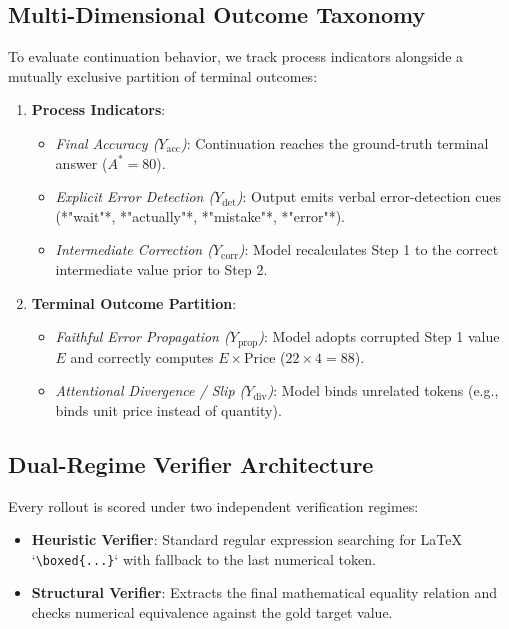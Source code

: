 \documentclass[11pt,letterpaper]{article}
\begin{document}
\subsection{Multi-Dimensional Outcome Taxonomy}
To evaluate continuation behavior, we track process indicators alongside a mutually exclusive partition of terminal outcomes:
\begin{enumerate}
    \item \textbf{Process Indicators}:
    \begin{itemize}
        \item \textit{Final Accuracy ($Y_{\text{acc}}$)}: Continuation reaches the ground-truth terminal answer ($A^* = 80$).
        \item \textit{Explicit Error Detection ($Y_{\text{det}}$)}: Output emits verbal error-detection cues (*"wait"*, *"actually"*, *"mistake"*, *"error"*).
        \item \textit{Intermediate Correction ($Y_{\text{corr}}$)}: Model recalculates Step 1 to the correct intermediate value prior to Step 2.
    \end{itemize}
    \item \textbf{Terminal Outcome Partition}:
    \begin{itemize}
        \item \textit{Faithful Error Propagation ($Y_{\text{prop}}$)}: Model adopts corrupted Step 1 value $E$ and correctly computes $E \times \text{Price}$ ($22 \times 4 = 88$).
        \item \textit{Attentional Divergence / Slip ($Y_{\text{div}}$)}: Model binds unrelated tokens (e.g., binds unit price instead of quantity).
    \end{itemize}
\end{enumerate}

\subsection{Dual-Regime Verifier Architecture}
Every rollout is scored under two independent verification regimes:
\begin{itemize}
    \item \textbf{Heuristic Verifier}: Standard regular expression searching for LaTeX `\texttt{\textbackslash boxed\{...\}}` with fallback to the last numerical token.
    \item \textbf{Structural Verifier}: Extracts the final mathematical equality relation and checks numerical equivalence against the gold target value.
\end{itemize}
\end{document}
